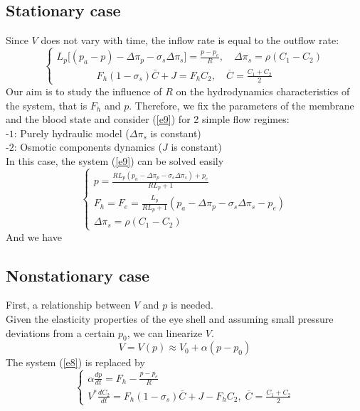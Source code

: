 \documentclass[english,12pt]{article}
\begin{document}
\subsection{Stationary case}
Since $V$ does not vary with time, the inflow rate is equal to the outflow rate:
\begin{equation}\label{e9}
\left\{\begin{array}{ll}
L_p \big[ (p_a-p)- \Delta\pi_{p}-\sigma_{s} \Delta\pi_{s}\big]=\displaystyle{\frac{p-p_{e}}{R}}, \quad \Delta\pi_{s}=\rho(C_1-C_{2})\\
\qquad\qquad F_h (1-\sigma_s) \bar{C}+J=F_h C_2, \quad\overline{C}= \displaystyle{\frac{C_1+C_2}{2}}
\end{array}\right.
\end{equation}
Our aim is to study the influence of $R$ on the hydrodynamics characteristics of the system, that is $F_h$ and $p$. Therefore, we fix the parameters of the membrane and the blood state and consider (\ref{e9}) for 2 simple flow regimes:\\
-$1$: Purely hydraulic model ($\Delta\pi_s$ is constant)\\
-$2$: Osmotic components dynamics ($J$ is constant)\\
In this case, the system (\ref{e9}) can be solved easily
\begin{equation}\label{e10}
\left\{\begin{array}{ll}
p=\displaystyle{\frac{R L_p(p_a-\Delta\pi_{p}-\sigma_{s} \Delta\pi_{s})+p_e}{R L_p+1}}\\
F_h=F_e=\displaystyle{\frac{L_p}{R L_p +1}}(p_a-\Delta\pi_{p}-\sigma_{s} \Delta\pi_{s}-p_e)\\
\Delta\pi_{s}=\rho(C_1-C_{2})
\end{array}\right.
\end{equation}
And we have

\subsection{Nonstationary case}
First, a relationship between $V$ and $p$ is needed.\\
Given the elasticity properties of the eye shell and assuming small pressure deviations from a certain $p_0$, we can linearize $V$.
\begin{equation}
V = V(p) \approx V_0 + \alpha (p-p_0)
\end{equation}
The system (\ref{e8}) is replaced by
\begin{equation}\label{e8}
\left\{\begin{array}{ll}
 \alpha \displaystyle{\frac{dp}{dt}}=F_{h}-\displaystyle{\frac{p-p_e}{R}}\\
V^{\ast} \displaystyle{\frac{dC_{2}}{dt}}= F_h(1-\sigma_s)\overline{C} + J - F_hC_2,\; \overline{C}= \frac{C_1+C_2}{2}
\end{array}\right.
\end{equation}
\end{document}
